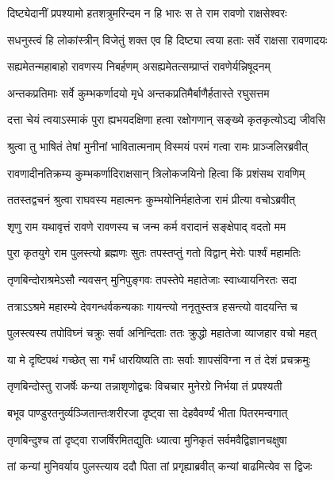 \twolineshloka
{दिष्ट्येदानीं प्रपश्यामो हतशत्रुमरिन्दम}
{न हि भारः स ते राम रावणो राक्षसेश्वरः} %

\twolineshloka
{सधनुस्त्वं हि लोकांस्त्रीन् विजेतुं शक्त एव हि}
{दिष्ट्या त्वया हताः सर्वे राक्षसा रावणादयः} %

\twolineshloka
{सह्यमेतन्महाबाहो रावणस्य निबर्हणम्}
{असह्यमेतत्सम्प्राप्तं रावणेर्यन्निषूदनम्} %

\twolineshloka
{अन्तकप्रतिमाः सर्वे कुम्भकर्णादयो मृधे}
{अन्तकप्रतिमैर्बाणैर्हतास्ते रघुसत्तम} %

\twolineshloka
{दत्ता चेयं त्वयाऽस्माकं पुरा ह्यभयदक्षिणा}
{हत्वा रक्षोगणान् सङ्ख्ये कृतकृत्योऽद्य जीवसि} %

\twolineshloka
{श्रुत्वा तु भाषितं तेषां मुनीनां भावितात्मनाम्}
{विस्मयं परमं गत्वा रामः प्राञ्जलिरब्रवीत्} %

\twolineshloka
{रावणादीनतिक्रम्य कुम्भकर्णादिराक्षसान्}
{त्रिलोकजयिनो हित्वा किं प्रशंसथ रावणिम्} %

\twolineshloka
{ततस्तद्वचनं श्रुत्वा राघवस्य महात्मनः}
{कुम्भयोनिर्महातेजा रामं प्रीत्या वचोऽब्रवीत्} %

\twolineshloka
{शृणु राम यथावृत्तं रावणे रावणस्य च}
{जन्म कर्म वरादानं सङ्क्षेपाद् वदतो मम} %

\twolineshloka
{पुरा कृतयुगे राम पुलस्त्यो ब्रह्मणः सुतः}
{तपस्तप्तुं गतो विद्वान् मेरोः पार्श्वं महामतिः} %

\twolineshloka
{तृणबिन्दोराश्रमेऽसौ न्यवसन् मुनिपुङ्गवः}
{तपस्तेपे महातेजाः स्वाध्यायनिरतः सदा} %

\twolineshloka
{तत्राऽऽश्रमे महारम्ये देवगन्धर्वकन्यकाः}
{गायन्त्यो ननृतुस्तत्र हसन्त्यो वादयन्ति च} %

\twolineshloka
{पुलस्त्यस्य तपोविघ्नं चक्रुः सर्वा अनिन्दिताः}
{ततः क्रुद्धो महातेजा व्याजहार वचो महत्} %

\twolineshloka
{या मे दृष्टिपथं गच्छेत् सा गर्भं धारयिष्यति}
{ताः सर्वाः शापसंविग्ना न तं देशं प्रचक्रमुः} %

\twolineshloka
{तृणबिन्दोस्तु राजर्षेः कन्या तन्नाशृणोद्वचः}
{विचचार मुनेरग्रे निर्भया तं प्रपश्यती} %

\twolineshloka
{बभूव पाण्डुरतनुर्व्यञ्जितान्तःशरीरजा}
{दृष्ट्वा सा देहवैवर्ण्यं भीता पितरमन्वगात्} %

\twolineshloka
{तृणबिन्दुश्च तां दृष्ट्वा राजर्षिरमितद्युतिः}
{ध्यात्वा मुनिकृतं सर्वमवैद्विज्ञानचक्षुषा} %

\twolineshloka
{तां कन्यां मुनिवर्याय पुलस्त्याय ददौ पिता}
{तां प्रगृह्याब्रवीत् कन्यां बाढमित्येव स द्विजः} %

